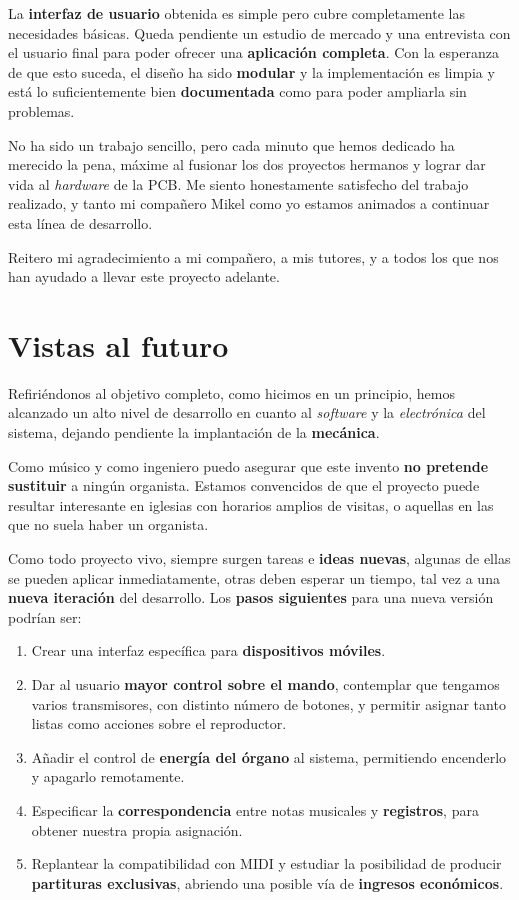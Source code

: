 La \textbf{interfaz de usuario} obtenida es simple pero cubre completamente las necesidades básicas. Queda pendiente un estudio de mercado y una entrevista con el usuario final para poder ofrecer una \textbf{aplicación completa}. Con la esperanza de que esto suceda, el diseño ha sido \textbf{modular} y la implementación es limpia y está lo suficientemente bien \textbf{documentada} como para poder ampliarla sin problemas.

No ha sido un trabajo sencillo, pero cada minuto que hemos dedicado ha merecido la pena, máxime al fusionar los dos proyectos hermanos y lograr dar vida al \textit{hardware} de la \acrshort{PCB}. Me siento honestamente satisfecho del trabajo realizado, y tanto mi compañero Mikel como yo estamos animados a continuar esta línea de desarrollo.

Reitero mi agradecimiento a mi compañero, a mis tutores, y a todos los que nos han ayudado a llevar este proyecto adelante.

\newpage

\section{Vistas al futuro}

Refiriéndonos al objetivo completo, como hicimos en un principio, hemos alcanzado un alto nivel de desarrollo en cuanto al \textit{software} y la \textit{electrónica} del sistema, dejando pendiente la implantación de la \textbf{mecánica}.

Como músico y como ingeniero puedo asegurar que este invento \textbf{no pretende sustituir} a ningún organista. Estamos convencidos de que el proyecto puede resultar interesante en iglesias con horarios amplios de visitas, o aquellas en las que no suela haber un organista.

Como todo proyecto vivo, siempre surgen tareas e \textbf{ideas nuevas}, algunas de ellas se pueden aplicar inmediatamente, otras deben esperar un tiempo, tal vez a una \textbf{nueva iteración} del desarrollo. Los \textbf{pasos siguientes} para una nueva versión podrían ser:

\begin{enumerate}
	\item Crear una interfaz específica para \textbf{dispositivos móviles}.
	\item Dar al usuario \textbf{mayor control sobre el mando}, contemplar que tengamos varios transmisores, con distinto número de botones, y permitir asignar tanto listas como acciones sobre el reproductor.
	\item Añadir el control de \textbf{energía del órgano} al sistema, permitiendo encenderlo y apagarlo remotamente.
	\item Especificar la \textbf{correspondencia} entre notas musicales y \textbf{registros}, para obtener nuestra propia asignación.
	\item Replantear la compatibilidad con \acrshort{MIDI} y estudiar la posibilidad de producir \textbf{partituras exclusivas}, abriendo una posible vía de \textbf{ingresos económicos}.
\end{enumerate}

